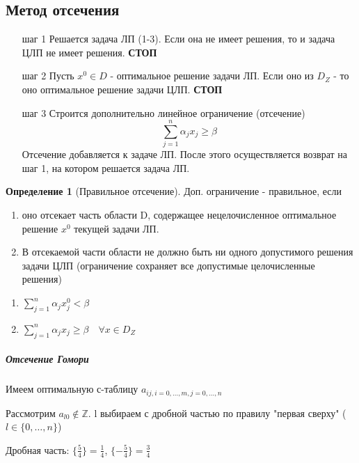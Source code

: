 \documentclass[a4paper]{article}
\theoremstyle{definition}
\newtheorem*{definition}{Определение}
\theoremstyle{remark}
\begin{document}
\subsection{Метод отсечения}
\begin{enumerate}
    \item [шаг 1] Решается задача ЛП (1-3). Если она не имеет решения, то и задача ЦЛП не имеет решения. \textbf{СТОП}
    \item [шаг 2] Пусть $x^0\in D$ - оптимальное решение задачи ЛП. Если оно из $D_Z$ - то оно оптимальное решение задачи ЦЛП. \textbf{СТОП}
    \item [шаг 3] Строится дополнительно линейное ограничение (отсечение)
    \[\sum_{j = 1}^n \alpha_j x_j \ge \beta\]
    Отсечение добавляется к задаче ЛП.
    После этого осуществляется возврат на шаг 1, на котором решается задача ЛП.
\end{enumerate}
\begin{definition}[Правильное отсечение]
    Доп. ограничение - правильное, если
    \begin{enumerate}
        \item оно отсекает часть области D, содержащее нецелочисленное оптимальное решение $x^0$ текущей задачи ЛП.
        \item В отсекаемой части области не должно быть ни одного допустимого решения задачи ЦЛП (ограничение сохраняет все допустимые целочисленные решения)
    \end{enumerate}
\end{definition}
\begin{enumerate}
    \item $\sum_{j = 1}^n \alpha_j x_j^0 < \beta$
    \item  $\sum_{j = 1}^n \alpha_j x_j \ge \beta \quad \forall x \in D_Z$
\end{enumerate}
\subparagraph*{Отсечение Гомори}
Имеем оптимальную с-таблицу $a_{ij, i = 0, \dots, m, j = 0, \dots, n}$

Рассмотрим $a_{l0}\notin \mathbb{Z}$. l выбираем с дробной частью по правилу "первая сверху" ($l\in \{0, \dots, n\}$)

Дробная часть: $\{\frac54\} = \frac14$, $\{-\frac54\} = \frac34$
\end{document}
